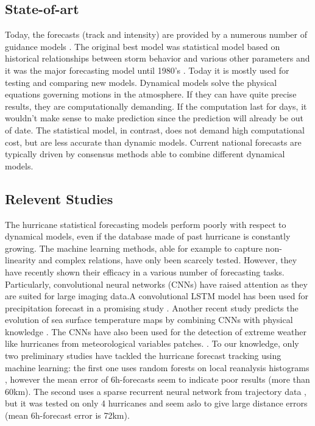 \subsection{State-of-art}
Today, the forecasts (track and intensity) are provided by a numerous number of guidance models \cite{nhc_models}. The original best model was statistical model based on historical relationships between storm behavior and various other parameters and it was the major forecasting model until 1980's \cite{demaria2005further}. Today it is mostly used for testing and comparing new models. Dynamical models solve the physical equations governing motions in the atmosphere. If they can have quite precise results, they are computationally demanding. If the computation last for days, it wouldn't make sense to make prediction since the prediction will already be out of date. The statistical model, in contrast, does not demand high computational cost, but are less accurate than dynamic models. Current national forecasts are typically driven by consensus methods able to combine different dynamical models.


\subsection{Relevent Studies}
The hurricane statistical forecasting models perform poorly with respect to dynamical models, even if the database made of past hurricane is constantly growing. The machine learning methods, able for example to capture non-linearity and complex relations, have only been scarcely tested. However, they have recently shown their efficacy in a various number of forecasting tasks. Particularly, convolutional neural networks (CNNs) have raised attention as they are suited for large imaging data.A convolutional LSTM model has been used for precipitation forecast in a promising study \cite{xingjian2015convolutional}. Another recent study predicts the evolution of sea surface temperature maps by combining CNNs with physical knowledge \cite{de2017deep}. The CNNs have also been used for the detection of extreme weather like hurricanes from meteorological variables patches. \cite{racah2017extremeweather}.
To our knowledge, only two preliminary studies have tackled the hurricane forecast tracking using machine learning: the first one uses random forests on local reanalysis histograms \cite{liberge2011prevision}, however the mean error of 6h-forecasts seem to indicate poor results (more than 60km). The second uses a sparse recurrent neural network from trajectory data \cite{moradi2016sparse}, but it was tested on only 4 hurricanes and seem aslo to give large distance errors (mean 6h-forecast error is 72km).



